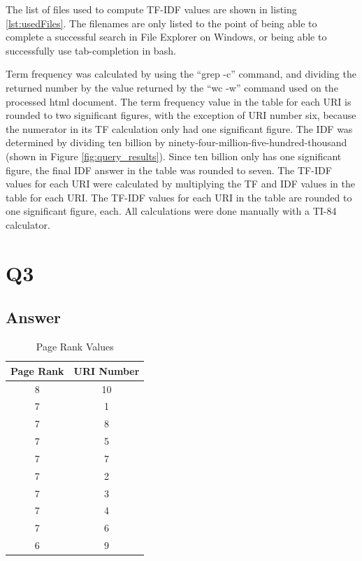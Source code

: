 \documentclass[12pt]{article}
\begin{document}
The list of files used to compute TF-IDF values are shown in listing \ref{lst:usedFiles}.  The filenames are only listed to the point of being able to complete a successful search in File Explorer on Windows, or being able to successfully use tab-completion in bash.

Term frequency was calculated by using the ``grep -c'' command, and dividing the returned number by the value returned by the ``wc -w'' command used on the processed html document.  The term frequency value in the table for each URI is rounded to two significant figures, with the exception of URI number six, because the numerator in its TF calculation only had one significant figure.  The IDF  was determined by dividing ten billion by ninety-four-million-five-hundred-thousand (shown in Figure \ref{fig:query_results}).  Since ten billion only has one significant figure, the final IDF answer in the table was rounded to seven.  The TF-IDF values for each URI were calculated by multiplying the TF and IDF values in the table for each URI.  The TF-IDF values for each URI in the table are rounded to one significant figure, each.  All calculations were done manually with a TI-84 calculator.


\section*{Q3}

\subsection*{Answer}

\begin{table}[h]

\centering
\caption{Page Rank Values}
\label{tbl:PageRank}
\begin{tabular}{|c|c|}
\hline
\textbf{Page Rank} & \textbf{URI Number} \\ \hline
8 & 10 \\ \hline
7 & 1 \\ \hline
7 & 8 \\ \hline
7 & 5 \\ \hline
7 & 7 \\ \hline
7 & 2 \\ \hline
7 & 3 \\ \hline
7 & 4 \\ \hline
7 & 6 \\ \hline
6 & 9 \\ \hline


\end{tabular}
\end{table}
\end{document}
